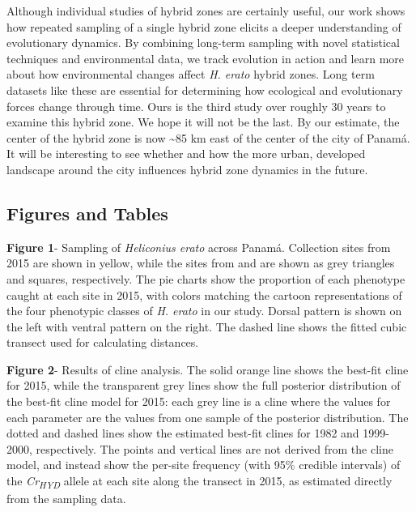 \documentclass[]{article}
\begin{document}
Although individual studies of hybrid zones are certainly useful, our
work shows how repeated sampling of a single hybrid zone elicits a
deeper understanding of evolutionary dynamics. By combining long-term
sampling with novel statistical techniques and environmental data, we
track evolution in action and learn more about how environmental changes
affect \textit{H. erato} hybrid zones. Long term datasets like these are
essential for determining how ecological and evolutionary forces change
through time. Ours is the third study over roughly 30 years to examine
this hybrid zone. We hope it will not be the last. By our estimate, the
center of the hybrid zone is now \textasciitilde{}85 km east of the
center of the city of Panamá. It will be interesting to see whether and
how the more urban, developed landscape around the city influences
hybrid zone dynamics in the future.



\nolinenumbers
\pagebreak
{}

\subsection{Figures and Tables}\label{figures-and-tables}

\textbf{Figure 1}- Sampling of \textit{Heliconius erato} across Panamá.
Collection sites from 2015 are shown in yellow, while the sites from
\citet{Mallet:1986vj} and \citet{Blum:2002wr} are shown as grey
triangles and squares, respectively. The pie charts show the proportion
of each phenotype caught at each site in 2015, with colors matching the
cartoon representations of the four phenotypic classes of
\textit{H. erato} in our study. Dorsal pattern is shown on the left with
ventral pattern on the right. The dashed line shows the fitted cubic
transect used for calculating distances.

\textbf{Figure 2}- Results of cline analysis. The solid orange line
shows the best-fit cline for 2015, while the transparent grey lines show
the full posterior distribution of the best-fit cline model for 2015:
each grey line is a cline where the values for each parameter are the
values from one sample of the posterior distribution. The dotted and
dashed lines show the estimated best-fit clines for 1982 and 1999-2000,
respectively. The points and vertical lines are not derived from the
cline model, and instead show the per-site frequency (with 95\% credible
intervals) of the \textit{Cr\textsubscript{HYD}} allele at each site
along the transect in 2015, as estimated directly from the sampling
data.
\end{document}

